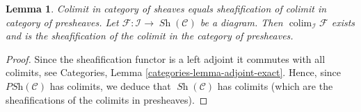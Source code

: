 \documentclass[10pt,a4paper]{amsart}
\newenvironment{slogan}{\comment}{\endcomment}
\theoremstyle{plain}
\newtheorem{lemma}[subsection]{Lemma}
\theoremstyle{definition}
\theoremstyle{remark}
\numberwithin{equation}{subsection}
\def\colim{\mathop{\mathrm{colim}}\nolimits}
\def\Sh{\mathop{\mathit{Sh}}\nolimits}
\begin{document}
\begin{lemma}
\label{lemma-colimit-sheaves}
\begin{slogan}
Colimit in category of sheaves equals sheafification of colimit in
category of presheaves.
\end{slogan}
Let $\mathcal{F} : \mathcal{I} \to \Sh(\mathcal{C})$
be a diagram. Then $\colim_\mathcal{I} \mathcal{F}$ exists
and is the sheafification of the colimit in the category of presheaves.
\end{lemma}

\begin{proof}
Since the sheafification functor is a left adjoint it commutes
with all colimits, see Categories,
Lemma \ref{categories-lemma-adjoint-exact}.
Hence, since $\textit{PSh}(\mathcal{C})$ has colimits, we deduce
that $\Sh(\mathcal{C})$ has colimits (which are the
sheafifications of the colimits in presheaves).
\end{proof}
\end{document}
